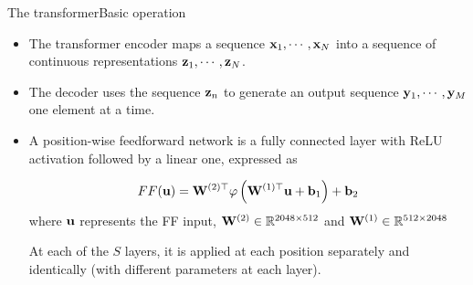 \documentclass{beamer}
\begin{document}
\begin{frame}{The transformer}{Basic operation}
    \begin{itemize}
        \item The transformer encoder maps a sequence ${\bf x}_1, \cdots, {\bf x}_N$ into a sequence of continuous representations ${\bf z}_1, \cdots, {\bf z}_N$. 
        \item The decoder uses the sequence ${\bf z}_n$ to generate an output sequence ${\bf y}_1, \cdots, {\bf y}_M$ one element at a time.
        \item A position-wise feedforward network is a fully connected layer with ReLU activation followed by a linear one, expressed as 

\begin{equation}
    FF({\bf u}) = {\bf W}^{(2)\top}\varphi\left({\bf W}^{(1)\top} {\bf u} + {\bf b}_1\right) + {\bf b}_2 
\end{equation}
where ${\bf u}$ represents the FF input, ${\bf W}^{(2)}\in \mathbb{R}^{2048 \times 512}$ and ${\bf W}^{(1)} \in \mathbb{R}^{512 \times 2048}$

At each of the $S$ layers, it is applied at each position separately and identically (with different parameters at each layer). 
\end{itemize}
\end{frame}
\end{document}
